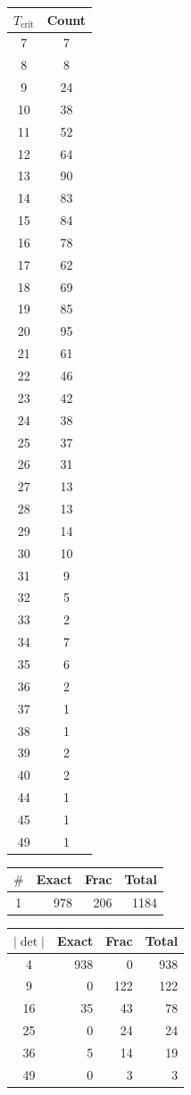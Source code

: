 \documentclass[10pt]{article}
\begin{document}
\begin{center}
\qquad\qquad
\begin{tabular}{c|c}
\toprule
$T_{\text{crit}}$ & Count \\
\midrule
7 & 7 \\
8 & 8 \\
9 & 24 \\
10 & 38 \\
11 & 52 \\
12 & 64 \\
13 & 90 \\
14 & 83 \\
15 & 84 \\
16 & 78 \\
17 & 62 \\
18 & 69 \\
19 & 85 \\
20 & 95 \\
21 & 61 \\
22 & 46 \\
23 & 42 \\
24 & 38 \\
25 & 37 \\
26 & 31 \\
27 & 13 \\
28 & 13 \\
29 & 14 \\
30 & 10 \\
31 & 9 \\
32 & 5 \\
33 & 2 \\
34 & 7 \\
35 & 6 \\
36 & 2 \\
37 & 1 \\
38 & 1 \\
39 & 2 \\
40 & 2 \\
44 & 1 \\
45 & 1 \\
49 & 1 \\
\bottomrule
\end{tabular}
\end{center}

\begin{center}
\begin{tabular}{c|r r r}
\toprule
$\#$ & Exact & Frac & Total \\
\midrule
1 & 978 & 206 & 1184 \\
\bottomrule
\end{tabular}
\qquad\qquad
\begin{tabular}{c|r r r}
\toprule
$|\det|$ & Exact & Frac & Total \\
\midrule
4 & 938 & 0 & 938 \\
9 & 0 & 122 & 122 \\
16 & 35 & 43 & 78 \\
25 & 0 & 24 & 24 \\
36 & 5 & 14 & 19 \\
49 & 0 & 3 & 3 \\
\bottomrule
\end{tabular}
\end{center}
\end{document}
